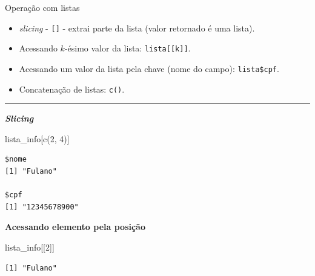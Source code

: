 \documentclass[
  10pt,
  ignorenonframetext,
]{beamer}
\newenvironment{Shaded}{\begin{snugshade}}{\end{snugshade}}
\newcommand{\DecValTok}[1]{\textcolor[rgb]{0.68,0.00,0.00}{#1}}
\newcommand{\FunctionTok}[1]{\textcolor[rgb]{0.28,0.35,0.67}{#1}}
\newcommand{\NormalTok}[1]{\textcolor[rgb]{0.00,0.23,0.31}{#1}}
\providecommand{\tightlist}{%
  \setlength{\itemsep}{0pt}\setlength{\parskip}{0pt}}\usepackage{longtable,booktabs,array}
\newcommand*{\regrafina}{\rule{\textwidth}{0.5pt}}
\begin{document}
\begin{frame}[fragile]{Operação com listas}
\protect\hypertarget{operauxe7uxe3o-com-listas}{}
\begin{itemize}
\tightlist
\item
  \emph{slicing} - \texttt{{[}{]}} - extrai parte da lista (valor
  retornado é uma lista).
\item
  Acessando \(k\)-ésimo valor da lista: \texttt{lista{[}{[}k{]}{]}}.
\item
  Acessando um valor da lista pela chave (nome do campo):
  \texttt{lista\$cpf}.
\item
  Concatenação de listas: \texttt{c()}.
\end{itemize}

\regrafina

\textbf{\emph{Slicing}}

\begin{Shaded}
\begin{Highlighting}[]
\NormalTok{lista\_info[}\FunctionTok{c}\NormalTok{(}\DecValTok{2}\NormalTok{, }\DecValTok{4}\NormalTok{)]}
\end{Highlighting}
\end{Shaded}

\begin{verbatim}
$nome
[1] "Fulano"

$cpf
[1] "12345678900"
\end{verbatim}

\textbf{Acessando elemento pela posição}

\begin{Shaded}
\begin{Highlighting}[]
\NormalTok{lista\_info[[}\DecValTok{2}\NormalTok{]]}
\end{Highlighting}
\end{Shaded}

\begin{verbatim}
[1] "Fulano"
\end{verbatim}
\end{frame}
\end{document}
